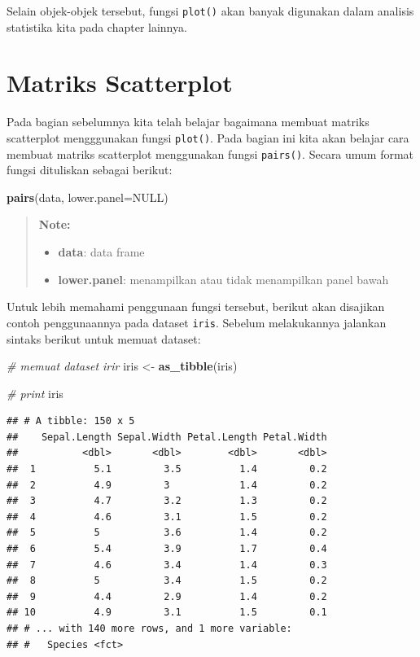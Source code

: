 \documentclass[]{book}
\newenvironment{Shaded}{\begin{snugshade}}{\end{snugshade}}
\newcommand{\KeywordTok}[1]{\textcolor[rgb]{0.13,0.29,0.53}{\textbf{#1}}}
\newcommand{\DataTypeTok}[1]{\textcolor[rgb]{0.13,0.29,0.53}{#1}}
\newcommand{\StringTok}[1]{\textcolor[rgb]{0.31,0.60,0.02}{#1}}
\newcommand{\CommentTok}[1]{\textcolor[rgb]{0.56,0.35,0.01}{\textit{#1}}}
\newcommand{\OtherTok}[1]{\textcolor[rgb]{0.56,0.35,0.01}{#1}}
\newcommand{\NormalTok}[1]{#1}
\providecommand{\tightlist}{%
  \setlength{\itemsep}{0pt}\setlength{\parskip}{0pt}}
\begin{document}
Selain objek-objek tersebut, fungsi \texttt{plot()} akan banyak
digunakan dalam analisis statistika kita pada chapter lainnya.

\section{Matriks Scatterplot}\label{matriks-scatterplot}

Pada bagian sebelumnya kita telah belajar bagaimana membuat matriks
scatterplot mengggunakan fungsi \texttt{plot()}. Pada bagian ini kita
akan belajar cara membuat matriks scatterplot menggunakan fungsi
\texttt{pairs()}. Secara umum format fungsi dituliskan sebagai berikut:

\begin{Shaded}
\begin{Highlighting}[]
\KeywordTok{pairs}\NormalTok{(data, }\DataTypeTok{lower.panel=}\OtherTok{NULL}\NormalTok{)}
\end{Highlighting}
\end{Shaded}

\begin{quote}
\textbf{Note: }

\begin{itemize}
\tightlist
\item
  \textbf{data}: data frame
\item
  \textbf{lower.panel}: menampilkan atau tidak menampilkan panel bawah
\end{itemize}
\end{quote}

Untuk lebih memahami penggunaan fungsi tersebut, berikut akan disajikan
contoh penggunaannya pada dataset \texttt{iris}. Sebelum melakukannya
jalankan sintaks berikut untuk memuat dataset:

\begin{Shaded}
\begin{Highlighting}[]
\CommentTok{# memuat dataset irir}
\NormalTok{iris <-}\StringTok{ }\KeywordTok{as_tibble}\NormalTok{(iris)}

\CommentTok{# print}
\NormalTok{iris}
\end{Highlighting}
\end{Shaded}

\begin{verbatim}
## # A tibble: 150 x 5
##    Sepal.Length Sepal.Width Petal.Length Petal.Width
##           <dbl>       <dbl>        <dbl>       <dbl>
##  1          5.1         3.5          1.4         0.2
##  2          4.9         3            1.4         0.2
##  3          4.7         3.2          1.3         0.2
##  4          4.6         3.1          1.5         0.2
##  5          5           3.6          1.4         0.2
##  6          5.4         3.9          1.7         0.4
##  7          4.6         3.4          1.4         0.3
##  8          5           3.4          1.5         0.2
##  9          4.4         2.9          1.4         0.2
## 10          4.9         3.1          1.5         0.1
## # ... with 140 more rows, and 1 more variable:
## #   Species <fct>
\end{verbatim}
\end{document}
